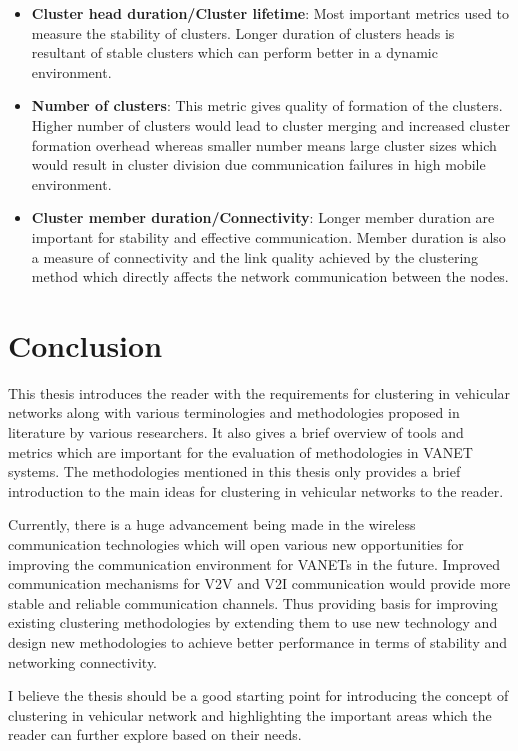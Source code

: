 \documentclass[]{ccs-thesis}
\begin{document}
\begin{itemize}
    \item \textbf{Cluster head duration/Cluster lifetime}: Most important metrics used to measure the stability of clusters.
    Longer duration of clusters heads is resultant of stable clusters which can perform better in a dynamic environment. 
    \item \textbf{Number of clusters}: This metric gives quality of formation of the clusters. Higher number of clusters
    would lead to cluster merging and increased cluster formation overhead whereas smaller number means large cluster sizes
    which would result in cluster division due communication failures in high mobile environment.
    \item \textbf{Cluster member duration/Connectivity}: Longer member duration are important for stability and effective
    communication. Member duration is also a measure of connectivity and the link quality achieved by the clustering method
    which directly affects the network communication between the nodes.
\end{itemize}


\chapter{Conclusion}
\label{sec:conclusions}

This thesis introduces the reader with the requirements for clustering in vehicular networks along with various
terminologies and methodologies proposed in literature by various researchers. It also gives a brief overview
of tools and metrics which are important for the evaluation of methodologies in \ac{VANET} systems. The methodologies
mentioned in this thesis only provides a brief introduction to the main ideas for clustering in vehicular networks to
the reader. 

Currently, there is a huge advancement being made in the wireless communication technologies which will open
various new opportunities for improving the communication environment for \ac{VANET}s in the future.
Improved communication mechanisms for \ac{V2V} and \ac{V2I} communication would provide more stable and
reliable communication channels. Thus providing basis for improving existing clustering methodologies by
extending them to use new technology and design new methodologies to achieve better performance in terms
of stability and networking connectivity. 

I believe the thesis should be a good starting point for introducing the concept of clustering in vehicular
network and highlighting the important areas which the reader can further explore based on their needs.

\cleardoublepage

\listofabbreviations
\clearpage

\listoffigures
\clearpage

\listoftables
\clearpage

\printbibliography
\end{document}
